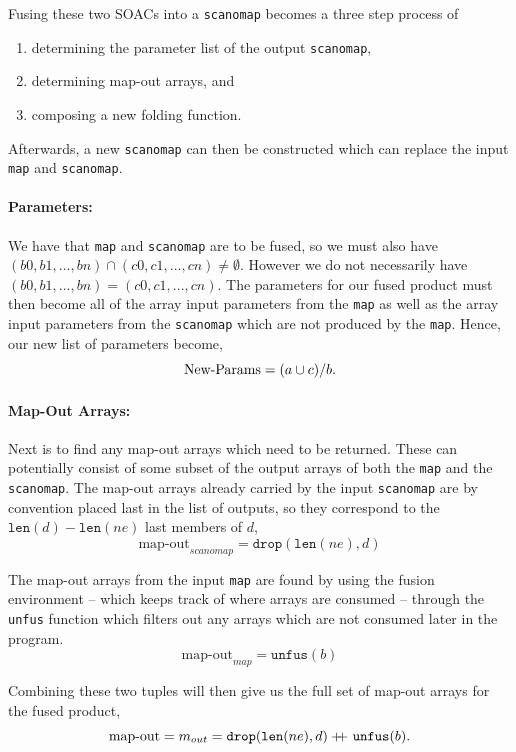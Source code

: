 \documentclass[11pt,bibliography=totocnumbered]{article}
\newcommand\doubleplus{+\kern-1.3ex+\kern0.8ex}
\begin{document}
Fusing these two SOACs into a \texttt{scanomap} becomes a three step process of
\begin{enumerate}
\item determining the parameter list of the output \texttt{scanomap},
\item determining map-out arrays, and
\item composing a new folding function.
\end{enumerate}
Afterwards, a new \texttt{scanomap} can then be constructed which can replace the input \texttt{map} and \texttt{scanomap}.
\paragraph{Parameters:}

We have that \texttt{map} and \texttt{scanomap} are to be fused, so we must also have $(b0, b1, ...,bn) \cap (c0, c1, ..., cn) \neq \emptyset$. However
 we do not necessarily have $(b0, b1, ...,bn) = (c0, c1, ..., cn)$. The parameters for our fused product must then become all of the array input parameters from the \texttt{map} as well as
 the array input parameters from the \texttt{scanomap} which are not produced by the \texttt{map}. Hence, our new list of parameters become,
$$\text{New-Params} = (a \cup c) / b\mathnormal{.}$$


\paragraph{Map-Out Arrays:}
Next is to find any map-out arrays which need to be returned. These can potentially consist of some subset of the output arrays of both the \texttt{map} and the \texttt{scanomap}. The map-out arrays
 already carried by the input \texttt{scanomap} are by convention placed last in the list of outputs, so they correspond to the $\mathtt{len}(d) - \mathtt{len}(ne)$ last members of $d$,
$$\text{map-out}_{scanomap} = \mathtt{drop}(\mathtt{len}(ne),d)$$

The map-out arrays from the input \texttt{map} are found by using the fusion environment
 -- which keeps track of where arrays are consumed -- through the \texttt{unfus} function which
 filters out any arrays which are not consumed later in the program.
$$\text{map-out}_{map} = \mathtt{unfus} (b)$$

Combining these two tuples will then give us the full set of map-out arrays for the fused product,
$$\text{map-out} = m_{out} = \mathtt{drop}(\mathtt{len}(ne),d) \doubleplus \mathtt{unfus} (b)\mathnormal{.}$$
\end{document}
